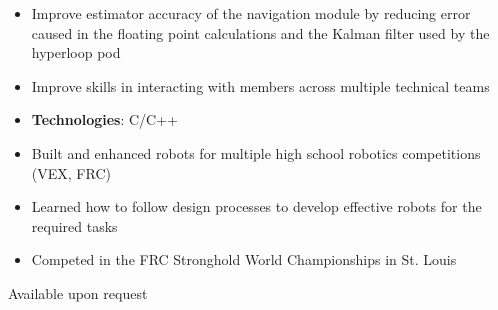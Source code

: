 \documentclass[10pt, letterpaper, ragged2e, withhyper]{altacv}
\begin{document}
\begin{paracol}{2}
    \divider
    
    \begin{itemize}
        \item Improve estimator accuracy of the navigation module by reducing error caused in the floating point
        calculations and the Kalman filter used by the hyperloop pod
        \item Improve skills in interacting with members across multiple technical teams
        \item \textbf{Technologies}: C/C++
    \end{itemize}

    \divider

    \begin{itemize}
        \item Built and enhanced robots for multiple high school robotics competitions (VEX, FRC)
        \item Learned how to follow design processes to develop effective robots for the required tasks
        \item Competed in the FRC Stronghold World Championships in St. Louis 
    \end{itemize}

    Available upon request

\end{paracol}
\end{document}
